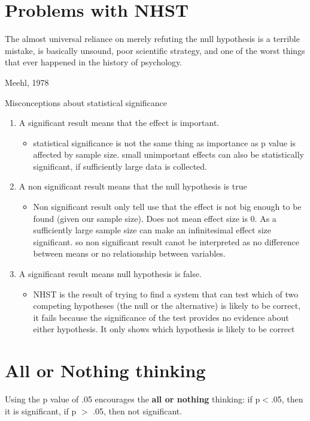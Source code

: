 
\section{Problems with NHST}
\epigraph{The almost universal reliance on merely refuting the null hypothesis is a terrible
mistake, is basically unsound, poor scientific strategy, and one of the worst things that
ever happened in the history of psychology.}{Meehl, 1978}

Misconceptions about statistical significance
\begin{enumerate}
	\item A significant result means that the effect is important. 
	\begin{itemize}
		\item statistical significance is not the same thing as importance as p value is affected by sample size. small unimportant effects can also be statistically significant, if sufficiently large data is collected.
   	\end{itemize}
	\item A non significant result means that the null hypothesis is true
	\begin{itemize}
		\item Non significant result only tell use that the effect is not big enough to be found (given our sample size). Does not mean effect size is 0. As a sufficiently large sample size can make an infinitesimal effect size significant. so non significant result canot be interpreted as no difference between means or no relationship between variables.
	\end{itemize}
	\item A significant result means null hypothesis is false.
		\begin{itemize}
		\item NHST is the result of trying to find a system that can test which of
two competing hypotheses (the null or the alternative) is likely to be correct, it fails because
the significance of the test provides no evidence about either hypothesis. It only shows which hypothesis is likely to be correct
	\end{itemize}
\end{enumerate}

\section{All or Nothing thinking}
Using the p value of .05 encourages the \textbf{all or nothing} thinking: if p$<$.05, then it is significant, if p $>$ .05, then not significant.

